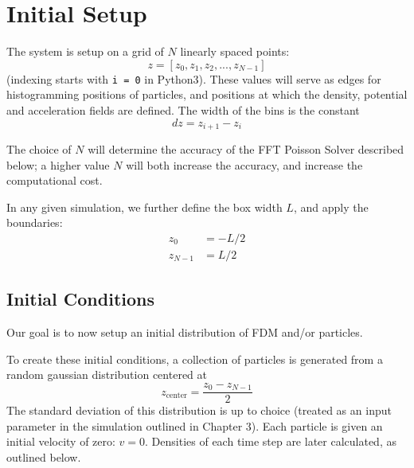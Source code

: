 \documentclass[oneside]{book}
\begin{document}
\section{Initial Setup}
The system is setup on a grid of $N$ linearly spaced points:
\begin{equation}
    z = [z_0, z_1, z_2, ..., z_{N-1}]
    \label{grid}
\end{equation}
(indexing starts with \texttt{i = 0} in Python3). These values will serve as edges for histogramming positions of particles, and positions at which the density, potential and acceleration fields are defined. The width of the bins is the constant
$$dz = z_{i+1} - z_i$$

The choice of $N$ will determine the accuracy of the FFT Poisson Solver described below; a higher value $N$ will both increase the accuracy, and increase the computational cost. 

In any given simulation, we further define the box width $L$, and apply the boundaries:
\begin{align}
    z_0 &= -L/2 \\ 
    z_{N-1} &= L/2
\end{align}

\subsection{Initial Conditions}
Our goal is to now setup an initial distribution of FDM and/or particles.

To create these initial conditions, a collection of particles is generated from a random gaussian distribution centered at 
$$z_\text{center} = \frac{z_0 -z_{N-1}}{2} $$
The standard deviation of this distribution is up to choice (treated as an input parameter in the simulation outlined in Chapter 3). Each particle is given an initial velocity of zero: $v = 0$. Densities of each time step are later calculated, as outlined below.
\end{document}
